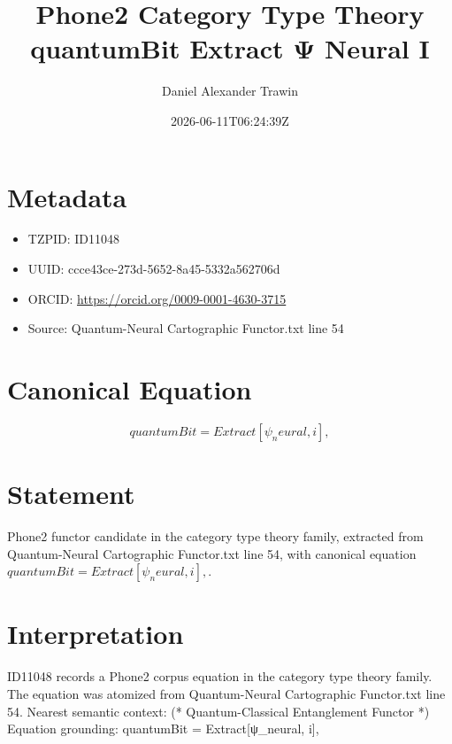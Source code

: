 \documentclass[11pt]{article}
\title{Phone2 Category Type Theory quantumBit Extract Ψ Neural I}
\author{Daniel Alexander Trawin}
\date{2026-06-11T06:24:39Z}
\begin{document}
\maketitle
\section*{Metadata}
\begin{itemize}
\item TZPID: ID11048
\item UUID: ccce43ce-273d-5652-8a45-5332a562706d
\item ORCID: \url{https://orcid.org/0009-0001-4630-3715}
\item Source: Quantum-Neural Cartographic Functor.txt line 54
\end{itemize}
\section*{Canonical Equation}
\[
quantumBit = Extract[ψ_neural, {i}],
\]
\section*{Statement}
Phone2 functor candidate in the category type theory family, extracted from Quantum-Neural Cartographic Functor.txt line 54, with canonical equation $quantumBit = Extract[ψ_neural, {i}],$.
\section*{Interpretation}
ID11048 records a Phone2 corpus equation in the category type theory family. The equation was atomized from Quantum-Neural Cartographic Functor.txt line 54. Nearest semantic context: (* Quantum-Classical Entanglement Functor *) Equation grounding: quantumBit = Extract[ψ_neural, {i}],
\end{document}

